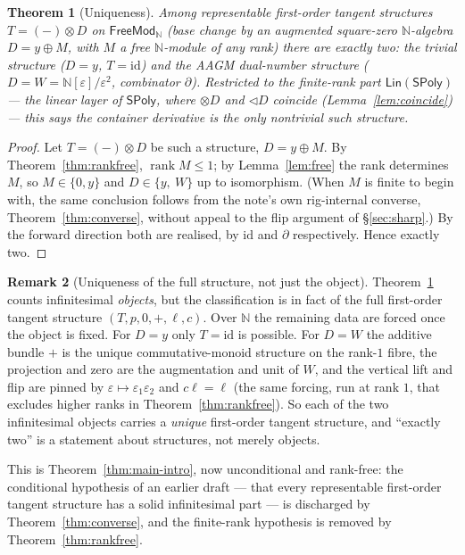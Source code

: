 \documentclass[11pt]{article}
\newtheorem{theorem}{Theorem}
\theoremstyle{definition}
\newtheorem{remark}[theorem]{Remark}
\newcommand{\SPoly}{\mathsf{SPoly}}
\newcommand{\Lin}{\mathsf{Lin}}
\newcommand{\FreeMod}{\mathsf{FreeMod}}
\newcommand{\N}{\mathbb{N}}
\newcommand{\id}{\mathrm{id}}
\newcommand{\rank}{\operatorname{rank}}
\begin{document}
\begin{theorem}[Uniqueness]\label{thm:uniqueness}
Among representable first-order tangent structures $T=(-)\otimes D$ on $\FreeMod_\N$ (base change by
an augmented square-zero $\N$-algebra $D=y\oplus M$, with $M$ a free $\N$-module of \emph{any} rank)
there are exactly two: the trivial structure ($D=y$, $T=\id$) and the AAGM dual-number structure
($D=W=\N[\varepsilon]/\varepsilon^2$, combinator $\partial$). Restricted to the finite-rank part
$\Lin(\SPoly)$ --- the linear layer of $\SPoly$, where $\otimes D$ and $\lhd D$ coincide
(Lemma~\ref{lem:coincide}) --- this says the container derivative is the only nontrivial such
structure.
\end{theorem}

\begin{proof}
Let $T=(-)\otimes D$ be such a structure, $D=y\oplus M$. By Theorem~\ref{thm:rankfree}, $\rank M\le1$;
by Lemma~\ref{lem:free} the rank determines $M$, so $M\in\{0,y\}$ and $D\in\{y,\ W\}$ up to
isomorphism. (When $M$ is finite to begin with, the same conclusion follows from the note's own
rig-internal converse, Theorem~\ref{thm:converse}, without appeal to the flip argument of
\S\ref{sec:sharp}.) By the
forward direction both are realised, by $\id$ and $\partial$ respectively. Hence exactly two.
\end{proof}

\begin{remark}[Uniqueness of the full structure, not just the object]\label{rem:fulldata}
Theorem~\ref{thm:uniqueness} counts infinitesimal \emph{objects}, but the classification is in fact
of the full first-order tangent structure $(T,p,0,+,\ell,c)$. Over $\N$ the remaining data are forced
once the object is fixed. For $D=y$ only $T=\id$ is possible. For $D=W$ the additive bundle $+$ is the
unique commutative-monoid structure on the rank-$1$ fibre, the projection and zero are the
augmentation and unit of $W$, and the vertical lift and flip are pinned by
$\varepsilon\mapsto\varepsilon_1\varepsilon_2$ and $c\ell=\ell$ (the same forcing, run at rank $1$,
that excludes higher ranks in Theorem~\ref{thm:rankfree}). So each of the two
infinitesimal objects carries a \emph{unique} first-order tangent structure, and ``exactly two'' is a
statement about structures, not merely objects.
\end{remark}

This is Theorem~\ref{thm:main-intro}, now unconditional and rank-free: the conditional hypothesis of
an earlier draft --- that every representable first-order tangent structure has a solid infinitesimal
part --- is discharged by Theorem~\ref{thm:converse}, and the finite-rank hypothesis is removed by
Theorem~\ref{thm:rankfree}.
\end{document}

